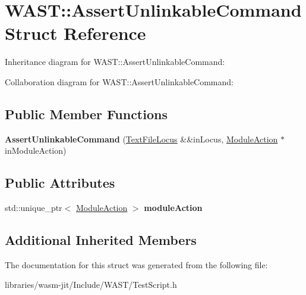 \hypertarget{struct_w_a_s_t_1_1_assert_unlinkable_command}{}\section{W\+A\+ST\+:\+:Assert\+Unlinkable\+Command Struct Reference}
\label{struct_w_a_s_t_1_1_assert_unlinkable_command}


Inheritance diagram for W\+A\+ST\+:\+:Assert\+Unlinkable\+Command\+:


Collaboration diagram for W\+A\+ST\+:\+:Assert\+Unlinkable\+Command\+:
\subsection*{Public Member Functions}
\begin{DoxyCompactItemize}
\item 
\mbox{\label{struct_w_a_s_t_1_1_assert_unlinkable_command_ab718b362ac2be1142356134889aaed81}} 
{\bfseries Assert\+Unlinkable\+Command} (\mbox{\hyperlink{struct_w_a_s_t_1_1_text_file_locus}{Text\+File\+Locus}} \&\&in\+Locus, \mbox{\hyperlink{struct_w_a_s_t_1_1_module_action}{Module\+Action}} $\ast$in\+Module\+Action)
\end{DoxyCompactItemize}
\subsection*{Public Attributes}
\begin{DoxyCompactItemize}
\item 
\mbox{\label{struct_w_a_s_t_1_1_assert_unlinkable_command_a96fb758f48f5b49ca7cd917028e993fa}} 
std\+::unique\+\_\+ptr$<$ \mbox{\hyperlink{struct_w_a_s_t_1_1_module_action}{Module\+Action}} $>$ {\bfseries module\+Action}
\end{DoxyCompactItemize}
\subsection*{Additional Inherited Members}


The documentation for this struct was generated from the following file\+:\begin{DoxyCompactItemize}
\item 
libraries/wasm-\/jit/\+Include/\+W\+A\+S\+T/Test\+Script.\+h\end{DoxyCompactItemize}

